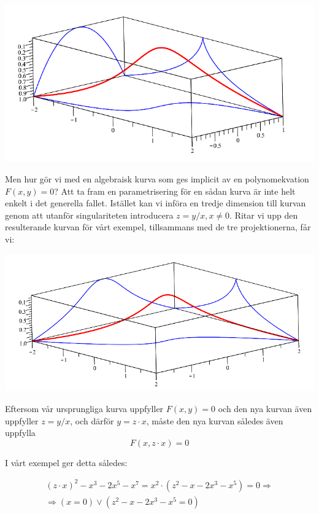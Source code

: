 \begin{center}
\includegraphics[scale=0.5]{Export/blowupex1_2.png}
\end{center}

Men hur gör vi med en algebraisk kurva som ges implicit av en polynomekvation $F(x,y)=0$? Att ta fram en parametrisering för en sådan kurva är inte helt enkelt i det generella fallet. Istället kan vi införa en tredje dimension till kurvan genom att utanför singulariteten introducera $z=y/x, x \neq 0$. Ritar vi upp den resulterande kurvan för vårt exempel, tillsammans med de tre projektionerna, får vi:

\begin{center}
\includegraphics[scale=0.5]{Export/blowupex1_3.png}
\end{center}

Eftersom vår ursprungliga kurva uppfyller $F(x,y)=0$ och den nya kurvan även uppfyller $z=y/x$, och därför $y=z\cdot x$, måste den nya kurvan således även uppfylla
\[F(x,z\cdot x)=0\]

I vårt exempel ger detta således:

\[
\begin{array}{c}
(z\cdot x)^2-x^3-2x^5-x^7 = x^2 \cdot \left(z^2-x-2x^3-x^5\right) = 0 \Longrightarrow\\[5pt]
\Longrightarrow (x=0) \vee (z^2-x-2x^3-x^5=0)\\
\end{array}
\]

